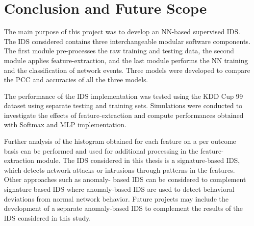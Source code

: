 \documentclass[12pt]{article}
\theoremstyle{definition}
\begin{document}
	\section{Conclusion and Future Scope}
	The main purpose of this project was to develop an NN-based supervised IDS. The IDS considered contains three interchangeable modular software components. The first
	module pre-processes the raw training and testing data, the second module applies feature-extraction, and the last module performs the NN training and the classification of
	network events. Three models were developed to compare the PCC and accuracies of all the three models.
	
	The performance of the IDS implementation was tested using the KDD Cup 99 dataset using separate testing and training sets. Simulations were conducted to investigate the effects of feature-extraction and compute performances obtained with Softmax and MLP implementation.
	
	Further analysis of the histogram obtained for each feature on a per outcome basis can be performed and used for additional processing in the feature-extraction module.
	The IDS considered in this thesis is a signature-based IDS, which detects network attacks or intrusions through patterns in the features. Other approaches such as anomaly-
	based IDS can be considered to complement signature based IDS where anomaly-based IDS are used to detect behavioral deviations from normal network behavior. Future projects may include the development of a separate anomaly-based IDS
	to complement the results of the IDS considered in this study.
	
	
	\cleardoublepage
	
	
		
	
	
	
	
	
	
	
	
	
	
	
	
	
	
	
	
	
	
	
	
	
\end{document}
